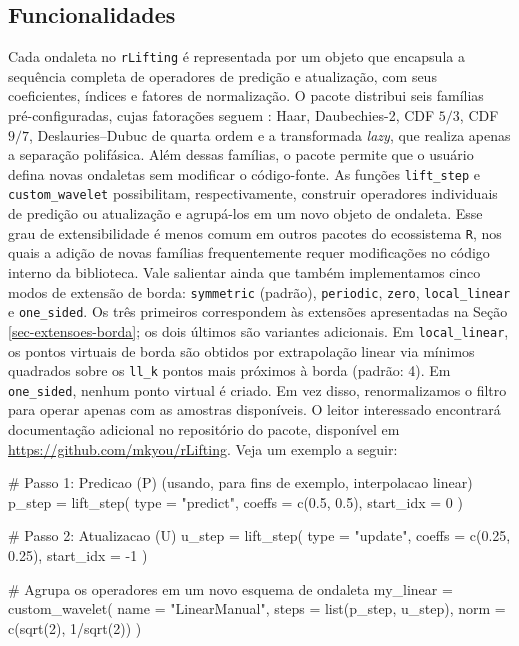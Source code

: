 \subsection{Funcionalidades}\label{sec-rlifting-funcionalidades}
Cada ondaleta no \texttt{rLifting} é representada por um objeto que encapsula a sequência completa de operadores de predição e atualização, com seus coeficientes, índices e fatores de normalização. 
O pacote distribui seis famílias pré-configuradas, cujas fatorações seguem : Haar, Daubechies-2, CDF \(5/3\), CDF \(9/7\), Deslauries--Dubuc de quarta ordem e a transformada \emph{lazy}, que realiza apenas a separação polifásica.
Além dessas famílias, o pacote permite que o usuário defina novas ondaletas sem modificar o código-fonte. 
As funções \texttt{lift\_step} e \texttt{custom\_wavelet} possibilitam, respectivamente, construir operadores individuais de predição ou atualização e agrupá-los em um novo objeto de ondaleta. 
Esse grau de extensibilidade é menos comum em outros pacotes do ecossistema \texttt{R}, nos quais a adição de novas famílias frequentemente requer modificações no código interno da biblioteca. 
Vale salientar ainda que também implementamos cinco modos de extensão de borda: \texttt{symmetric} (padrão), \texttt{periodic}, \texttt{zero}, \texttt{local\_linear} e \texttt{one\_sided}. 
Os três primeiros correspondem às extensões apresentadas na Seção \ref{sec-extensoes-borda}; os dois últimos são variantes adicionais. 
Em \texttt{local\_linear}, os pontos virtuais de borda são obtidos por extrapolação linear via mínimos quadrados sobre os \texttt{ll\_k} pontos mais próximos à borda (padrão: 4). 
Em \texttt{one\_sided}, nenhum ponto virtual é criado. 
Em vez disso, renormalizamos o filtro para operar apenas com as amostras disponíveis. 
O leitor interessado encontrará documentação adicional no repositório do pacote, disponível em \url{https://github.com/mkyou/rLifting}.
Veja um exemplo a seguir:

\begin{codeblock}
# Passo 1: Predicao (P) (usando, para fins de exemplo, interpolacao linear)
p_step = lift_step(
  type = "predict", 
  coeffs = c(0.5, 0.5), 
  start_idx = 0
)

# Passo 2: Atualizacao (U)
u_step = lift_step(
  type = "update", 
  coeffs = c(0.25, 0.25), 
  start_idx = -1
)

# Agrupa os operadores em um novo esquema de ondaleta
my_linear = custom_wavelet(
  name = "LinearManual",
  steps = list(p_step, u_step),
  norm = c(sqrt(2), 1/sqrt(2)) 
)
\end{codeblock}

